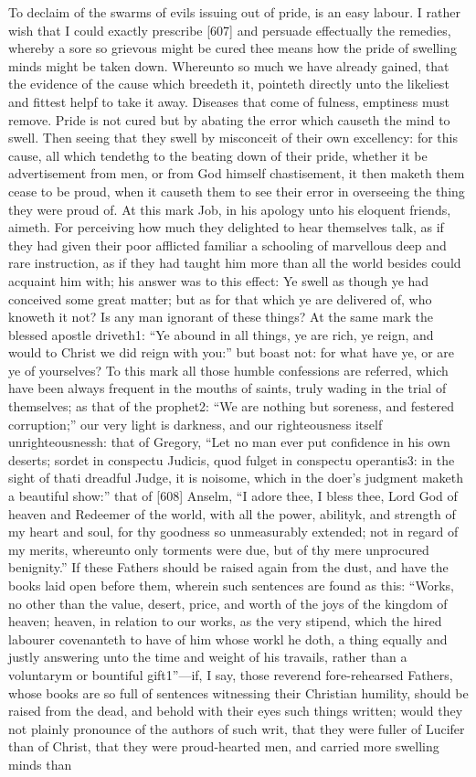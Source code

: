 To declaim of the swarms of evils issuing out of pride, is an easy labour. I rather wish that I could exactly prescribe [607] and persuade effectually the remedies, whereby a sore so grievous might be cured thee means how the pride of swelling minds might be taken down. Whereunto so much we have already gained, that the evidence of the cause which breedeth it, pointeth directly unto the likeliest and fittest helpf to take it away. Diseases that come of fulness, emptiness must remove. Pride is not cured but by abating the error which causeth the mind to swell. Then seeing that they swell by misconceit of their own excellency: for this cause, all which tendethg to the beating down of their pride, whether it be advertisement from men, or from God himself chastisement, it then maketh them cease to be proud, when it causeth them to see their error in overseeing the thing they were proud of. At this mark Job, in his apology unto his eloquent friends, aimeth. For perceiving how much they delighted to hear themselves talk, as if they had given their poor afflicted familiar a schooling of marvellous deep and rare instruction, as if they had taught him more than all the world besides could acquaint him with; his answer was to this effect: Ye swell as though ye had conceived some great matter; but as for that which ye are delivered of, who knoweth it not? Is any man ignorant of these things? At the same mark the blessed apostle driveth1: “Ye abound in all things, ye are rich, ye reign, and would to Christ we did reign with you:” but boast not: for what have ye, or are ye of yourselves? To this mark all those humble confessions are referred, which have been always frequent in the mouths of saints, truly wading in the trial of themselves; as that of the prophet2: “We are nothing but soreness, and festered corruption;” our very light is darkness, and our righteousness itself unrighteousnessh: that of Gregory, “Let no man ever put confidence in his own deserts; sordet in conspectu Judicis, quod fulget in conspectu operantis3: in the sight of thati dreadful Judge, it is noisome, which in the doer’s judgment maketh a beautiful show:” that of [608] Anselm, “I adore thee, I bless thee, Lord God of heaven and Redeemer of the world, with all the power, abilityk, and strength of my heart and soul, for thy goodness so unmeasurably extended; not in regard of my merits, whereunto only torments were due, but of thy mere unprocured benignity.” If these Fathers should be raised again from the dust, and have the books laid open before them, wherein such sentences are found as this: “Works, no other than the value, desert, price, and worth of the joys of the kingdom of heaven; heaven, in relation to our works, as the very stipend, which the hired labourer covenanteth to have of him whose workl he doth, a thing equally and justly answering unto the time and weight of his travails, rather than a voluntarym or bountiful gift1”—if, I say, those reverend fore-rehearsed Fathers, whose books are so full of sentences witnessing their Christian humility, should be raised from the dead, and behold with their eyes such things written; would they not plainly pronounce of the authors of such writ, that they were fuller of Lucifer than of Christ, that they were proud-hearted men, and carried more swelling minds than 